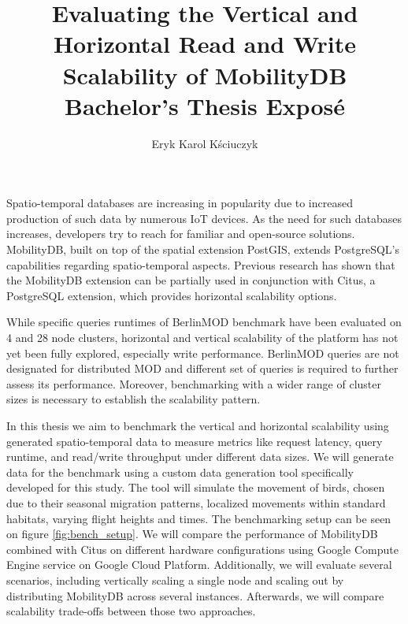 \documentclass{article}
\title{
	Evaluating the Vertical and Horizontal Read and Write Scalability of 
	MobilityDB
	\\[1ex] \large Bachelor's Thesis Exposé}
\author{Eryk Karol Kściuczyk}
\date{} %
\begin{document}
\maketitle

\vspace*{-0.3cm}

Spatio-temporal databases are increasing in popularity due to increased
production of such data by numerous IoT devices.
As the need for such databases increases, developers try to reach for 
familiar and open-source solutions.
MobilityDB, built on top of the spatial extension PostGIS, extends PostgreSQL's 
capabilities regarding spatio-temporal aspects.
Previous research has shown that the MobilityDB extension can be partially used
in conjunction with Citus, a PostgreSQL extension, which provides horizontal
scalability options.

While specific queries runtimes of BerlinMOD benchmark have been 
evaluated on 4 and 28 node clusters,
horizontal and vertical scalability of the platform has not yet been fully
explored, especially write performance.
BerlinMOD queries are not designated for distributed MOD and different set of
queries is required to further assess its performance.
Moreover, benchmarking with a wider range of cluster sizes is necessary to 
establish the scalability pattern.

In this thesis we aim to benchmark the vertical and horizontal scalability
using generated spatio-temporal data to measure metrics like request 
latency, query runtime, and read/write throughput under different data sizes.
We will generate data for the benchmark using a custom data generation tool
specifically developed for this study.
The tool will simulate the movement of birds, chosen due to their
seasonal migration patterns, localized movements within standard habitats,
varying flight heights and times. The benchmarking setup can be seen on figure
\ref{fig:bench_setup}.
%
We will compare the performance of MobilityDB combined with Citus on different
hardware configurations using Google Compute Engine service on Google Cloud
Platform.
Additionally, we will evaluate several scenarios, including vertically scaling 
a single node and scaling out by distributing MobilityDB across several
instances. 
Afterwards, we will compare scalability trade-offs between those two
approaches.
\end{document}
